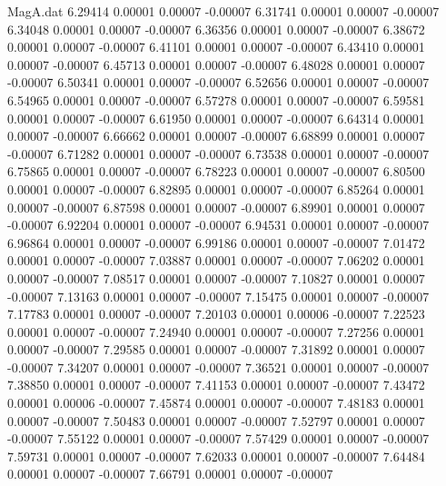 \begin{filecontents}{MagA.dat}
   6.29414    0.00001    0.00007   -0.00007
   6.31741    0.00001    0.00007   -0.00007
   6.34048    0.00001    0.00007   -0.00007
   6.36356    0.00001    0.00007   -0.00007
   6.38672    0.00001    0.00007   -0.00007
   6.41101    0.00001    0.00007   -0.00007
   6.43410    0.00001    0.00007   -0.00007
   6.45713    0.00001    0.00007   -0.00007
   6.48028    0.00001    0.00007   -0.00007
   6.50341    0.00001    0.00007   -0.00007
   6.52656    0.00001    0.00007   -0.00007
   6.54965    0.00001    0.00007   -0.00007
   6.57278    0.00001    0.00007   -0.00007
   6.59581    0.00001    0.00007   -0.00007
   6.61950    0.00001    0.00007   -0.00007
   6.64314    0.00001    0.00007   -0.00007
   6.66662    0.00001    0.00007   -0.00007
   6.68899    0.00001    0.00007   -0.00007
   6.71282    0.00001    0.00007   -0.00007
   6.73538    0.00001    0.00007   -0.00007
   6.75865    0.00001    0.00007   -0.00007
   6.78223    0.00001    0.00007   -0.00007
   6.80500    0.00001    0.00007   -0.00007
   6.82895    0.00001    0.00007   -0.00007
   6.85264    0.00001    0.00007   -0.00007
   6.87598    0.00001    0.00007   -0.00007
   6.89901    0.00001    0.00007   -0.00007
   6.92204    0.00001    0.00007   -0.00007
   6.94531    0.00001    0.00007   -0.00007
   6.96864    0.00001    0.00007   -0.00007
   6.99186    0.00001    0.00007   -0.00007
   7.01472    0.00001    0.00007   -0.00007
   7.03887    0.00001    0.00007   -0.00007
   7.06202    0.00001    0.00007   -0.00007
   7.08517    0.00001    0.00007   -0.00007
   7.10827    0.00001    0.00007   -0.00007
   7.13163    0.00001    0.00007   -0.00007
   7.15475    0.00001    0.00007   -0.00007
   7.17783    0.00001    0.00007   -0.00007
   7.20103    0.00001    0.00006   -0.00007
   7.22523    0.00001    0.00007   -0.00007
   7.24940    0.00001    0.00007   -0.00007
   7.27256    0.00001    0.00007   -0.00007
   7.29585    0.00001    0.00007   -0.00007
   7.31892    0.00001    0.00007   -0.00007
   7.34207    0.00001    0.00007   -0.00007
   7.36521    0.00001    0.00007   -0.00007
   7.38850    0.00001    0.00007   -0.00007
   7.41153    0.00001    0.00007   -0.00007
   7.43472    0.00001    0.00006   -0.00007
   7.45874    0.00001    0.00007   -0.00007
   7.48183    0.00001    0.00007   -0.00007
   7.50483    0.00001    0.00007   -0.00007
   7.52797    0.00001    0.00007   -0.00007
   7.55122    0.00001    0.00007   -0.00007
   7.57429    0.00001    0.00007   -0.00007
   7.59731    0.00001    0.00007   -0.00007
   7.62033    0.00001    0.00007   -0.00007
   7.64484    0.00001    0.00007   -0.00007
   7.66791    0.00001    0.00007   -0.00007

\end{filecontents}
